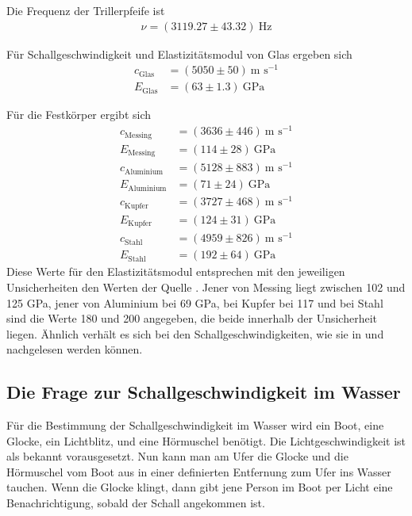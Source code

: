 \documentclass{article}
\begin{document}
Die Frequenz der Trillerpfeife ist
\begin{align*}
\nu = (3119.27\pm 43.32)~\text{Hz}
\end{align*}

Für Schallgeschwindigkeit und Elastizitätsmodul von Glas ergeben sich
\begin{align*}
c_\text{Glas} &= (5050 \pm 50)~\text{m s}^{-1} \\
E_\text{Glas} &= (63 \pm 1.3)~\text{GPa}
\end{align*}

Für die Festkörper ergibt sich
\begin{align*}
c_\text{Messing} &= (3636 \pm 446)~\text{m s}^{-1} \\
E_\text{Messing} &= (114 \pm 28)~\text{GPa} \\
c_\text{Aluminium} &= (5128 \pm 883)~\text{m s}^{-1} \\
E_\text{Aluminium} &= (71 \pm 24)~\text{GPa} \\
c_\text{Kupfer} &= (3727 \pm 468)~\text{m s}^{-1} \\
E_\text{Kupfer} &= (124 \pm 31)~\text{GPa} \\
c_\text{Stahl} &= (4959 \pm 826)~\text{m s}^{-1} \\
E_\text{Stahl} &= (192 \pm 64)~\text{GPa}
\end{align*}
Diese Werte für den Elastizitätsmodul entsprechen mit den jeweiligen Unsicherheiten den Werten der Quelle \cite{emodul}. Jener von Messing liegt zwischen 102 und 125 GPa, jener von Aluminium bei 69 GPa, bei Kupfer bei 117 und bei Stahl sind die Werte 180 und 200 angegeben, die beide innerhalb der Unsicherheit liegen. Ähnlich verhält es sich bei den Schallgeschwindigkeiten, wie sie in \cite{schall} und \cite{schall2} nachgelesen werden können.

\subsection{Die Frage zur Schallgeschwindigkeit im Wasser}

Für die Bestimmung der Schallgeschwindigkeit im Wasser wird ein Boot, eine Glocke, ein Lichtblitz, und eine Hörmuschel benötigt. Die Lichtgeschwindigkeit ist als bekannt vorausgesetzt. Nun kann man am Ufer die Glocke und die Hörmuschel vom Boot aus in einer definierten Entfernung zum Ufer ins Wasser tauchen. Wenn die Glocke klingt, dann gibt jene Person im Boot per Licht eine Benachrichtigung, sobald der Schall angekommen ist.
\end{document}
